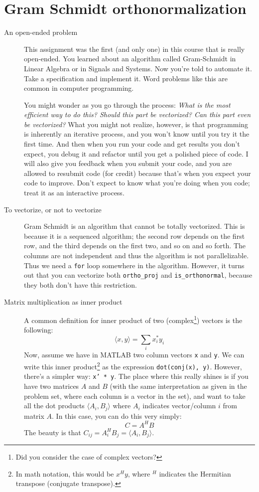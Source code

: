 \documentclass{article}
\begin{document}
\section{Gram Schmidt orthonormalization}
\begin{description}
\item[An open-ended problem] This assignment was the first (and only one) in this course that is really open-ended. You learned about an algorithm called Gram-Schmidt in Linear Algebra or in Signals and Systems. Now you're told to automate it. Take a specification and implement it. Word problems like this are common in computer programming.

You might wonder as you go through the process: \textit{What is the most efficient way to do this? Should this part be vectorized? Can this part even be vectorized?} What you might not realize, however, is that programming is inherently an iterative process, and you won't know until you try it the first time. And then when you run your code and get results you don't expect, you debug it and refactor until you get a polished piece of code. I will also give you feedback when you submit your code, and you are allowed to resubmit code (for credit) because that's when you expect your code to improve. Don't expect to know what you're doing when you code; treat it as an interactive process.

\item[To vectorize, or not to vectorize] Gram Schmidt is an algorithm that cannot be totally vectorized. This is because it is a sequenced algorithm; the second row depends on the first row, and the third depends on the first two, and so on and so forth. The columns are not independent and thus the algorithm is not parallelizable. Thus we need a \texttt{for} loop somewhere in the algorithm. However, it turns out that you can vectorize both \texttt{ortho_proj} and \texttt{is_orthonormal}, because they both don't have this restriction.

\item[Matrix multiplication as inner product] A common definition for inner product of two (complex\footnote{Did you consider the case of complex vectors?}) vectors is the following:
\[\langle x,y\rangle=\sum_ix_i^*y_i\]
Now, assume we have in MATLAB two column vectors \texttt{x} and \texttt{y}. We can write this inner product\footnote{In math notation, this would be $x^Hy$, where $^H$ indicates the Hermitian transpose (conjugate transpose).} as the expression \texttt{dot(conj(x), y)}. However, there's a simpler way: \texttt{x' * y}. The place where this really shines is if you have two matrices $A$ and $B$ (with the same interpretation as given in the problem set, where each column is a vector in the set), and want to take all the dot products $\langle A_i,B_j\rangle$ where $A_i$ indicates vector/column $i$ from matrix $A$. In this case, you can do this very simply: \[C=A^HB\] The beauty is that $C_{ij}=A_i^HB_j=\langle A_i,B_j\rangle$.


\end{description}
\end{document}
